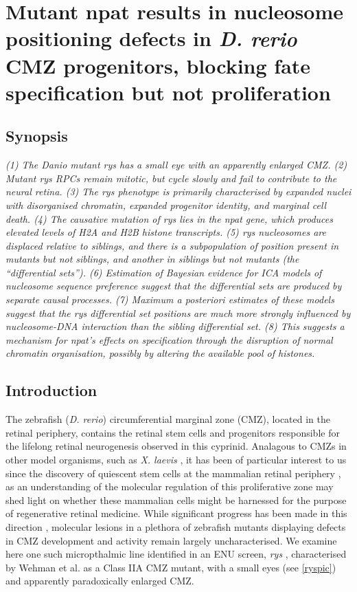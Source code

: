 \chapter{Mutant npat results in nucleosome positioning defects in \textit{D. rerio} CMZ progenitors, blocking fate specification but not proliferation}
\label{chap:rys}

\section*{Synopsis}
\textit{
(1) The \textit{Danio} mutant \emph{rys} has a small eye with an apparently enlarged CMZ. (2) Mutant \emph{rys} RPCs remain mitotic, but cycle slowly and fail to contribute to the neural retina. (3) The \emph{rys} phenotype is primarily characterised by expanded nuclei with disorganised chromatin, expanded progenitor identity, and marginal cell death. (4) The causative mutation of \emph{rys} lies in the npat gene, which produces elevated levels of H2A and H2B histone transcripts. (5) \emph{rys} nucleosomes are displaced relative to siblings, and there is a subpopulation of position present in mutants but not siblings, and another in siblings but not mutants (the ``differential sets''). (6) Estimation of Bayesian evidence for ICA models of nucleosome sequence preference suggest that the differential sets are produced by separate causal processes. (7) Maximum a posteriori estimates of these models suggest that the \emph{rys} differential set positions are much more strongly influenced by nucleosome-DNA interaction than the sibling differential set. (8) This suggests a mechanism for npat's effects on specification through the disruption of normal chromatin organisation, possibly by altering the available pool of histones.
}

\section{Introduction}
The zebrafish (\textit{D. rerio}) circumferential marginal zone (CMZ), located in the retinal periphery, contains the retinal stem cells and progenitors responsible for the lifelong retinal neurogenesis observed in this cyprinid. Analagous to CMZs in other model organisms, such as \textit{X. laevis} \cite{Perron1998}, it has been of particular interest to us since the discovery of quiescent stem cells at the mammalian retinal periphery \cite{Tropepe2000}, as an understanding of the molecular regulation of this proliferative zone may shed light on whether these mammalian cells might be harnessed for the purpose of regenerative retinal medicine. While significant progress has been made in this direction \cite{Raymond2006}, molecular lesions in a plethora of zebrafish mutants displaying defects in CMZ development and activity remain largely uncharacterised. We examine here one such micropthalmic line identified in an ENU screen, \textit{rys} \cite{Wehman2005}, characterised by Wehman et al. as a Class IIA CMZ mutant, with a small eyes (see \autoref{ryspic}) and apparently paradoxically enlarged CMZ.

